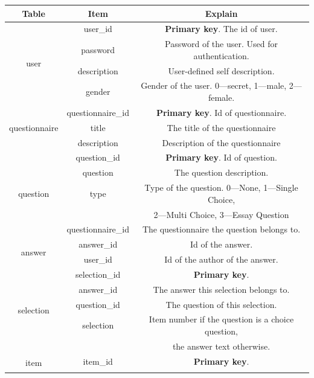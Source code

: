 \documentclass[scheme=plain,12pt]{ctexart}
\begin{document}
    \begin{center}
        \begin{tabular}{|c|c|c|}
            \hline
            Table & Item & Explain \\ \hline
            \multirow{4}{*}{user} & user\_id & \textbf{Primary key}. The id of user. \\ \cline{2-3}
             & password & Password of the user. Used for authentication. \\ \cline{2-3}
             & description & User-defined self description. \\ \cline{2-3}
             & gender & Gender of the user. 0---secret, 1---male, 2---female. \\ \hline
            \multirow{3}{*}{questionnaire} & questionnaire\_id & \textbf{Primary key}. Id of questionnaire. \\ \cline{2-3}
             & title & The title of the questionnaire \\ \cline{2-3}
             & description & Description of the questionnaire \\ \hline
            \multirow{5}{*}{question} & question\_id & \textbf{Primary key}. Id of question. \\ \cline{2-3}
             & question & The question description. \\ \cline{2-3}
             & type & Type of the question. 0---None, 1---Single Choice, \\
             & & 2---Multi Choice, 3---Essay Question \\ \cline{2-3}
             & questionnaire\_id & The questionnaire the question belongs to. \\ \hline
            \multirow{2}{*}{answer} & answer\_id & Id of the answer. \\ \cline{2-3}
             & user\_id & Id of the author of the answer. \\ \hline
            \multirow{5}{*}{selection} & selection\_id & \textbf{Primary key}. \\ \cline{2-3}
             & answer\_id & The answer this selection belongs to. \\ \cline{2-3}
             & question\_id & The question of this selection. \\ \cline{2-3}
             & selection & Item number if the question is a choice question, \\
             & & the answer text otherwise. \\ \hline
            \multirow{4}{*}{item} & item\_id & \textbf{Primary key}. \\ \cline{2-3}

\end{tabular}
\end{center}
\end{document}
